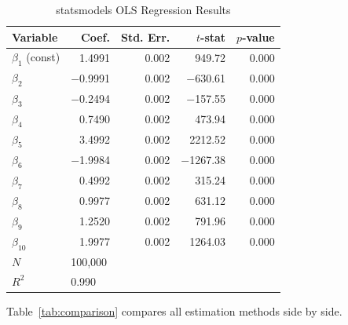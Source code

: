 \documentclass[12pt]{article}
\begin{document}
\begin{table}[ht]
\centering
\caption{statsmodels OLS Regression Results}
\label{tab:ols}
\begin{tabular}{lrrrr}
\toprule
Variable & Coef. & Std. Err. & $t$-stat & $p$-value \\
\midrule
$\beta_1$ (const) & 1.4991 & 0.002 & 949.72 & 0.000 \\
$\beta_2$         & $-$0.9991 & 0.002 & $-$630.61 & 0.000 \\
$\beta_3$         & $-$0.2494 & 0.002 & $-$157.55 & 0.000 \\
$\beta_4$         & 0.7490 & 0.002 & 473.94 & 0.000 \\
$\beta_5$         & 3.4992 & 0.002 & 2212.52 & 0.000 \\
$\beta_6$         & $-$1.9984 & 0.002 & $-$1267.38 & 0.000 \\
$\beta_7$         & 0.4992 & 0.002 & 315.24 & 0.000 \\
$\beta_8$         & 0.9977 & 0.002 & 631.12 & 0.000 \\
$\beta_9$         & 1.2520 & 0.002 & 791.96 & 0.000 \\
$\beta_{10}$      & 1.9977 & 0.002 & 1264.03 & 0.000 \\
\midrule
$N$ & \multicolumn{4}{l}{100,000} \\
$R^2$ & \multicolumn{4}{l}{0.990} \\
\bottomrule
\end{tabular}
\end{table}

Table~\ref{tab:comparison} compares all estimation methods side by side.
\end{document}
